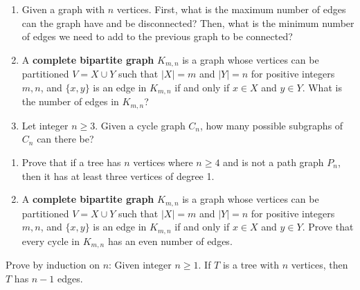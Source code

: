\documentclass{article}
\theoremstyle{definition}
\begin{document}
\begin{question}
    
\begin{enumerate}
	\item Given a graph with $n$ vertices. First, what is the maximum number of edges can the graph have and be disconnected? Then, what is the minimum number of edges we need to add to the previous graph to be connected?
	\item A \textbf{complete bipartite graph} $K_{m,n}$ is a graph whose vertices can be partitioned $V=X\cup Y$ such that $|X|=m$ and  $|Y|=n$ for positive integers $m,n$, and $\{x, y\}$ is an edge in $K_{m,n}$ if and only if $x\in X$ and $y\in Y$. What is the number of edges in $K_{m,n}$?
	\item Let integer $n\geq 3$. Given a cycle graph $C_n$, how many possible subgraphs of $C_n$ can there be?
	\end{enumerate}
\end{question}
\begin{solution}
\end{solution}


\begin{question}
\begin{enumerate}
	\item Prove that if a tree has $n$ vertices where $n\geq 4$ and is not a path graph $P_n$, then it has at least three vertices of degree 1.
	\item A \textbf{complete bipartite graph} $K_{m,n}$ is a graph whose vertices can be partitioned $V=X\cup Y$ such that $|X|=m$ and  $|Y|=n$ for positive integers $m,n$, and $\{x, y\}$ is an edge in $K_{m,n}$ if and only if $x\in X$ and $y\in Y$. Prove that every cycle in $K_{m, n}$ has an even number of edges.
	\end{enumerate}
\end{question}
\begin{solution}
\end{solution}


\begin{question}
    Prove by induction on $n$: Given integer $n\geq 1$. If  $T$ is a tree with $n$ vertices, then $T$ has $n-1$ edges. 
\end{question}
\begin{solution}
\end{solution}
\end{document}
